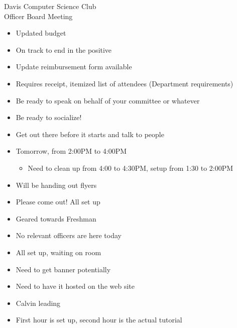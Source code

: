 \documentclass{article}
\begin{document}
\begin{Minutes}{Davis Computer Science Club\\Officer Board Meeting}
\begin {itemize}
\item Updated budget
\item On track to end in the positive
\item Update reimbursement form available
\item Requires receipt, itemized list of attendees (Department requirements)
\end {itemize}

\begin {itemize} 
\item Be ready to speak on behalf of your committee or whatever
\item Be ready to socialize!
\item Get out there before it starts and talk to people
\end {itemize}

\begin {itemize}
\item Tomorrow, from 2:00PM to 4:00PM
    \begin{itemize} 
    \item Need to clean up from 4:00 to 4:30PM, setup from 1:30 to 2:00PM
    \end {itemize}
\item Will be handing out flyers
\end {itemize}

\begin {itemize}
\item Please come out! All set up
\item Geared towards Freshman
\end {itemize}

\begin {itemize}
\item No relevant officers are here today 
\end {itemize}

\begin {itemize}
\item All set up, waiting on room 
\item Need to get banner potentially
\item Need to have it hosted on the web site
\end {itemize}

\begin {itemize} 
\item Calvin leading
\item First hour is set up, second hour is the actual tutorial
\end {itemize}


\end{Minutes}
\end{document}
